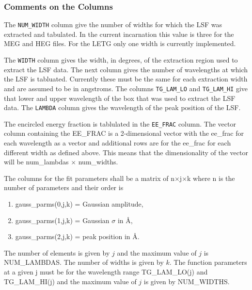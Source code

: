 \documentclass[twoside]{article}
\begin{document}
\subsubsection{Comments on the Columns}

The {\tt NUM\_WIDTH} column give the number of widths for which the LSF
was extracted and tabulated. In the current incarnation
this value is three for the MEG and HEG files. For the LETG only one
width is currently implemented.

The {\tt WIDTH} column gives the width, in degrees, of the extraction
region used to extract the LSF data. The next column gives the
number of wavelengths at which the LSF is tabluated. Currently these
must be the same for each extraction width and are assumed to be in
angstroms.  The columns {\tt TG\_LAM\_LO} and {\tt TG\_LAM\_HI} give
that lower and upper wavelength of the box that was used to extract
the LSF data. The {\tt LAMBDA} column gives the wavelength of the peak
position of the LSF.

The encircled energy fraction is tablulated in the {\tt EE\_FRAC}
column.  The vector column containing the EE\_FRAC is a
2-dimensional vector with the ee\_frac for each wavelength as a vector
and additional rows are for the ee\_frac for each different width as
defined above. This means that the dimensionality of the vector will
be num\_lambdas $\times$ num\_widths.


%
%
%

The columns for the fit parameters shall be a matrix of
n$\times$j$\times$k where n is the number of parameters and
their order is

\begin{enumerate}
\item gauss\_parms(0,j,k) = Gaussian amplitude,

\item gauss\_parms(1,j,k) = Gaussian $\sigma$ in \AA,

\item gauss\_parms(2,j,k) = peak position in \AA.
\end{enumerate}

The number of elements is given by $j$ and the maximum value of $j$ is
NUM\_LAMBDAS. The number of widths is given by $k$. The function
parameters at a given j must be for
the wavelength range TG\_LAM\_LO(j) and TG\_LAM\_HI(j) and the maximum
value of $j$ is given by NUM\_WIDTHS.
\end{document}
